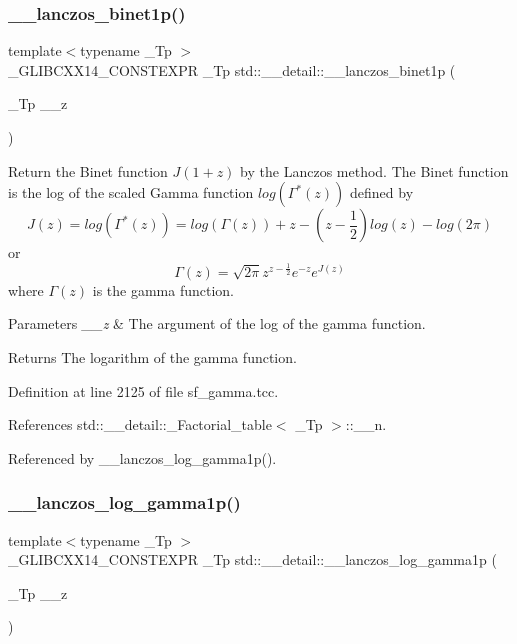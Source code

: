 \subsubsection{\texorpdfstring{\+\_\+\+\_\+lanczos\+\_\+binet1p()}{\_\_lanczos\_binet1p()}}
{\footnotesize\ttfamily template$<$typename \+\_\+\+Tp $>$ \\
\+\_\+\+G\+L\+I\+B\+C\+X\+X14\+\_\+\+C\+O\+N\+S\+T\+E\+X\+PR \+\_\+\+Tp std\+::\+\_\+\+\_\+detail\+::\+\_\+\+\_\+lanczos\+\_\+binet1p (\begin{DoxyParamCaption}\item[{\+\_\+\+Tp}]{\+\_\+\+\_\+z }\end{DoxyParamCaption})}



Return the Binet function $ J(1+z) $ by the Lanczos method. The Binet function is the log of the scaled Gamma function $ log(\Gamma^*(z)) $ defined by \[ J(z) = log(\Gamma^*(z)) = log\left(\Gamma(z)\right) + z - \left(z-\frac{1}{2}\right) log(z) - log(2\pi) \] or \[ \Gamma(z) = \sqrt{2\pi}z^{z-\frac{1}{2}}e^{-z}e^{J(z)} \] where $ \Gamma(z) $ is the gamma function. 


\begin{DoxyParams}{Parameters}
{\em \+\_\+\+\_\+z} & The argument of the log of the gamma function. \\
\hline
\end{DoxyParams}
\begin{DoxyReturn}{Returns}
The logarithm of the gamma function. 
\end{DoxyReturn}


Definition at line 2125 of file sf\+\_\+gamma.\+tcc.



References std\+::\+\_\+\+\_\+detail\+::\+\_\+\+Factorial\+\_\+table$<$ \+\_\+\+Tp $>$\+::\+\_\+\+\_\+n.



Referenced by \+\_\+\+\_\+lanczos\+\_\+log\+\_\+gamma1p().

\mbox{\label{namespacestd_1_1____detail_a4586aeea80ba556ab8d6393dadb05c5c}} 
\subsubsection{\texorpdfstring{\+\_\+\+\_\+lanczos\+\_\+log\+\_\+gamma1p()}{\_\_lanczos\_log\_gamma1p()}}
{\footnotesize\ttfamily template$<$typename \+\_\+\+Tp $>$ \\
\+\_\+\+G\+L\+I\+B\+C\+X\+X14\+\_\+\+C\+O\+N\+S\+T\+E\+X\+PR \+\_\+\+Tp std\+::\+\_\+\+\_\+detail\+::\+\_\+\+\_\+lanczos\+\_\+log\+\_\+gamma1p (\begin{DoxyParamCaption}\item[{\+\_\+\+Tp}]{\+\_\+\+\_\+z }\end{DoxyParamCaption})}



